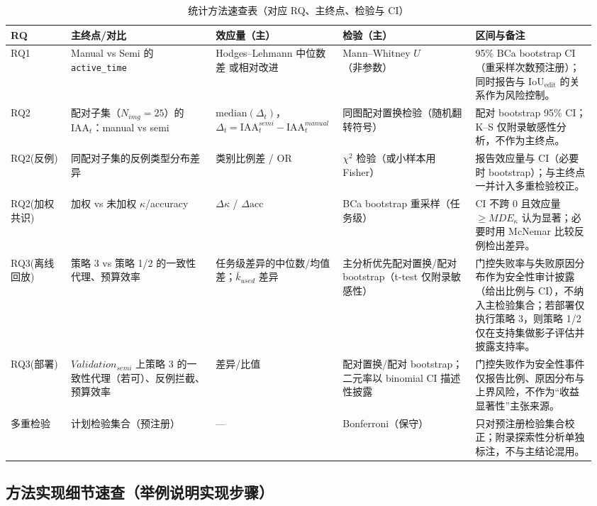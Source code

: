 \begin{table}[H]
\centering
\caption{统计方法速查表（对应 RQ、主终点、检验与 CI）}
\label{tab:stats-overview}
\small
\begin{tabular}{p{0.10\linewidth} p{0.24\linewidth} p{0.20\linewidth} p{0.22\linewidth} p{0.20\linewidth}}
\toprule
\textbf{RQ} & \textbf{主终点/对比} & \textbf{效应量（主）} & \textbf{检验（主）} & \textbf{区间与备注}
\\
\midrule
RQ1 & Manual vs Semi 的 \texttt{active\_time} & Hodges--Lehmann 中位数差 或相对改进 & Mann--Whitney $U$（非参数） & 95\% BCa bootstrap CI（重采样次数预注册）；同时报告与 $\mathrm{IoU}_{\mathrm{edit}}$ 的关系作为风险控制。\\
RQ2 & 配对子集（$N_{img}=25$）的 $\mathrm{IAA}_t$：manual vs semi & $\mathrm{median}(\Delta_t)$，$\Delta_t=\mathrm{IAA}_t^{semi}-\mathrm{IAA}_t^{manual}$ & 同图配对置换检验（随机翻转符号） & 配对 bootstrap 95\% CI；K--S 仅附录敏感性分析，不作为主终点。\\
RQ2(反例) & 同配对子集的反例类型分布差异 & 类别比例差 / OR & $\chi^2$ 检验（或小样本用 Fisher） & 报告效应量与 CI（必要时 bootstrap）；与主终点一并计入多重检验校正。\\
RQ2(加权共识) & 加权 vs 未加权 $\kappa$/accuracy & $\Delta\kappa$ / $\Delta\mathrm{acc}$ & BCa bootstrap 重采样（任务级） & CI 不跨 0 且效应量 $\geq MDE_{\kappa}$ 认为显著；必要时用 McNemar 比较反例检出差异。\\
RQ3(离线回放) & 策略 3 vs 策略 1/2 的一致性代理、预算效率 & 任务级差异的中位数/均值差；$\bar{k}_{used}$ 差异 & 主分析优先配对置换/配对 bootstrap（t-test 仅附录敏感性） & 门控失败率与失败原因分布作为安全性审计披露（给出比例与 CI），不纳入主检验集合；若部署仅执行策略 3，则策略 1/2 仅在支持集做影子评估并披露支持率。\\
RQ3(部署) & $Validation_{semi}$ 上策略 3 的一致性代理（若可）、反例拦截、预算效率 & 差异/比值 & 配对置换/配对 bootstrap；二元率以 binomial CI 描述性披露 & 门控失败作为安全性事件仅报告比例、原因分布与上界风险，不作为“收益显著性”主张来源。\\
多重检验 & 计划检验集合（预注册） & --- & Bonferroni（保守） & 只对预注册检验集合校正；附录探索性分析单独标注，不与主结论混用。\\
\bottomrule
\end{tabular}
\end{table}

\subsection{方法实现细节速查（举例说明实现步骤）}

